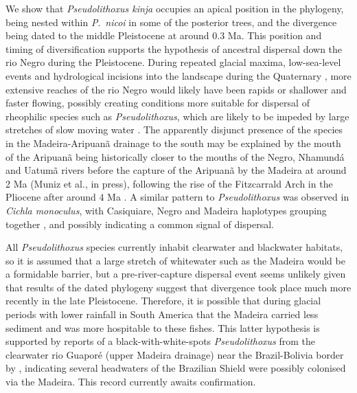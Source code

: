 \documentclass[12pt]{article}
\begin{document}
We show that \emph{Pseudolithoxus kinja} occupies an apical position in the phylogeny, being nested within \emph{P}.\ \emph{nicoi} in some of the posterior trees, and the divergence being dated to the middle Pleistocene at around 0.3 Ma. %
This position and timing of diversification supports the hypothesis of ancestral dispersal down the rio Negro during the Pleistocene. %
During repeated glacial maxima, low-sea-level events and hydrological incisions into the landscape during the Quaternary \citep{Irion1995}, more extensive reaches of the rio Negro would likely have been rapids or shallower and faster flowing, possibly creating conditions more suitable for dispersal of rheophilic species such as \emph{Pseudolithoxus}, which are likely to be impeded by large stretches of slow moving water \citep{deSouza2014,Wesselingh2011}. %
The apparently disjunct presence of the species in the Madeira-Aripuanã drainage to the south may be explained by the mouth of the Aripuanã being historically closer to the mouths of the Negro, Nhamundá and Uatumã rivers before the capture of the Aripuanã by the Madeira at around 2 Ma (Muniz et al., in press), following the rise of the Fitzcarrald Arch in the Pliocene after around 4 Ma \citep{Espurt2010}. %
A similar pattern to \emph{Pseudolithoxus} was observed in \emph{Cichla monoculus}, with Casiquiare, Negro and Madeira haplotypes grouping together \citep{Willis2010}, and possibly indicating a common signal of dispersal.%

All \emph{Pseudolithoxus} species currently inhabit clearwater and blackwater habitats, so it is assumed that a large stretch of whitewater such as the Madeira would be a formidable barrier, but a pre-river-capture dispersal event seems unlikely given that results of the dated phylogeny suggest that divergence took place much more recently in the late Pleistocene. %
Therefore, it is possible that during glacial periods with lower rainfall in South America \citep{Cheng2013} that the Madeira carried less sediment and was more hospitable to these fishes. %
This latter hypothesis is supported by reports of a black-with-white-spots \emph{Pseudolithoxus} from the clearwater rio Guaporé (upper Madeira drainage) near the Brazil-Bolivia border by \citet{Seidel2005}, indicating several headwaters of the Brazilian Shield were possibly colonised via the Madeira. %
This record currently awaits confirmation.
\end{document}
